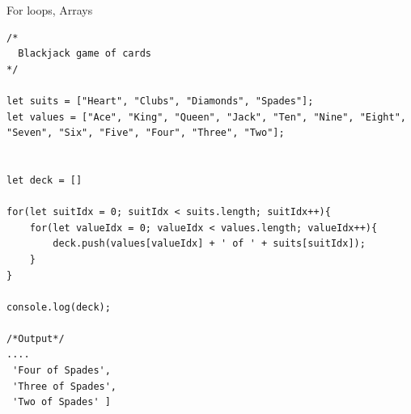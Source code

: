 \documentclass[10pt, a4paper, twocolumn]{article}
\begin{document}
For loops, Arrays

\begin{lstlisting}
/*
  Blackjack game of cards
*/

let suits = ["Heart", "Clubs", "Diamonds", "Spades"];
let values = ["Ace", "King", "Queen", "Jack", "Ten", "Nine", "Eight", "Seven", "Six", "Five", "Four", "Three", "Two"];


let deck = []

for(let suitIdx = 0; suitIdx < suits.length; suitIdx++){
    for(let valueIdx = 0; valueIdx < values.length; valueIdx++){
        deck.push(values[valueIdx] + ' of ' + suits[suitIdx]);
    }
}

console.log(deck);

/*Output*/
....
 'Four of Spades',
 'Three of Spades',
 'Two of Spades' ]
\end{lstlisting}


\printbibliography[title={Bibliography}] %

\end{document}
